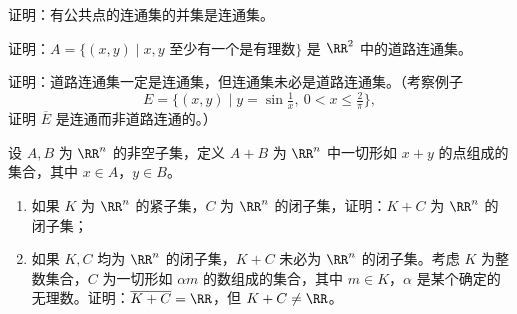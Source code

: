 \begin{xreferenceproblem}[3]
证明：有公共点的连通集的并集是连通集。
\end{xreferenceproblem}

\begin{xreferenceproblem}[4]
证明：$A=\{(x,y)\mid x,y\text{ 至少有一个是有理数}\}$ 是 $\RR^2$ 中的道路连通集。
\end{xreferenceproblem}

\begin{xreferenceproblem}[5]
证明：道路连通集一定是连通集，但连通集未必是道路连通集。（考察例子
  \[
    E=\{(x,y)\mid y=\sin\tfrac1x,\ 0<x\leq\tfrac2\pi\},
  \]
  证明 $\overline E$ 是连通而非道路连通的。）
\end{xreferenceproblem}

\begin{xreferenceproblem}[6]
设 $A,B$ 为 $\RR^n$ 的非空子集，定义 $A+B$ 为 $\RR^n$ 中一切形如 $x+y$ 的点组成的集合，其中 $x\in A$，$y\in B$。
  \begin{enumerate}[label=(\arabic*)]
    \item 如果 $K$ 为 $\RR^n$ 的紧子集，$C$ 为 $\RR^n$ 的闭子集，证明：$K+C$ 为 $\RR^n$ 的闭子集；
    \item 如果 $K,C$ 均为 $\RR^n$ 的闭子集，$K+C$ 未必为 $\RR^n$ 的闭子集。考虑 $K$ 为整数集合，$C$ 为一切形如 $\alpha m$ 的数组成的集合，其中 $m\in K$，$\alpha$ 是某个确定的无理数。证明：$\overline{K+C}=\RR$，但 $K+C\neq\RR$。
  \end{enumerate}
\end{xreferenceproblem}
